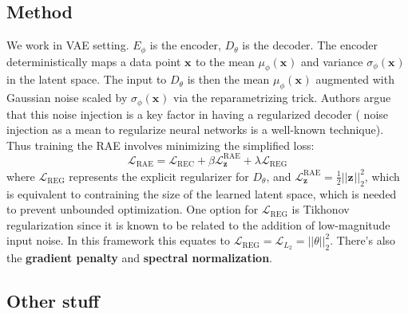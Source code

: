 \documentclass{article}
\begin{document}
\subsection{Method}
We work in VAE setting.
$ E_{ \phi }  $ is the encoder, $ D_{ \theta }  $ is the decoder.
The encoder deterministically maps a data point $ \bm{x}_{}  $ to
the mean $ \mu_{ \phi } (\bm{x}_{})  $ and variance $ \sigma_{ \phi } ( \bm{x}_{})  $
in the latent space.
The input to $ D_{ \theta }  $ is then the mean $ \mu_{ \phi } (\bm{x}_{})  $
augmented with Gaussian noise scaled by $ \sigma_{ \phi } (\bm{x}_{})  $
via the reparametrizing trick.
Authors argue that this noise injection is a key factor in having a regularized decoder (
noise injection as a mean to regularize neural networks is a well-known technique).
Thus training the RAE involves minimizing the simplified loss:
\begin{equation}
		\mathcal{L}_{ \text{RAE} } = 
\mathcal{L}_{ \text{REC} } + \beta \mathcal{L}^{ \text{RAE} }_{ \bm{z}_{} } 
+ \lambda \mathcal{L}_{ \text{REG} }
\end{equation}
where $ \mathcal{L}_{ \text{REG} }  $ represents the explicit regularizer for $ D_{ \theta }  $,
and $ \mathcal{L}^{ \text{RAE} }_{ \bm{z}_{} } = \frac{1}{2} ||\bm{z}_{}||_{ 2 }^{ 2 }  $,
which is equivalent to contraining the size of the learned latent space, which is needed
to prevent unbounded optimization.
One option for $ \mathcal{L}_{ \text{REG} }  $ is Tikhonov regularization
since it is known to be related to the addition of low-magnitude input noise.
In this framework this equates to 
$ \mathcal{L}_{ \text{REG} } = \mathcal{L}_{ L_{ 2 } } = ||\theta||^{ 2 }_{ 2 } $.
There's also the \textbf{gradient penalty} and
\textbf{spectral normalization}.


\subsection{Other stuff}
\end{document}
